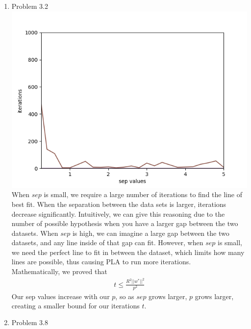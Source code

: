 \documentclass{article}
\begin{document}
\begin{enumerate}
        \item Problem 3.2\\
        \includegraphics[scale=0.5]{images/p3_2.png}\\
        When $sep$ is small, we require a large number of iterations to find the line of best fit. When the separation between the data sets is larger, iterations decrease significantly. Intuitively, we can give this reasoning due to the number of possible hypothesis when you have a larger gap between the two datasets. When $sep$ is high, we can imagine a large gap between the two datasets, and any line inside of that gap can fit. However, when $sep$ is small, we need the perfect line to fit in between the dataset, which limits how many lines are possible, thus causing PLA to run more iterations.\\[0.25in]
        Mathematically, we proved that
        \begin{align*}
            t \leq \frac{R^2 ||w^*||^2}{p^2}
        \end{align*}
        Our sep values increase with our $p$, so as $sep$ grows larger, $p$ grows larger, creating a smaller bound for our iterations $t$.

        \item Problem 3.8
    \end{enumerate}
\end{document}
